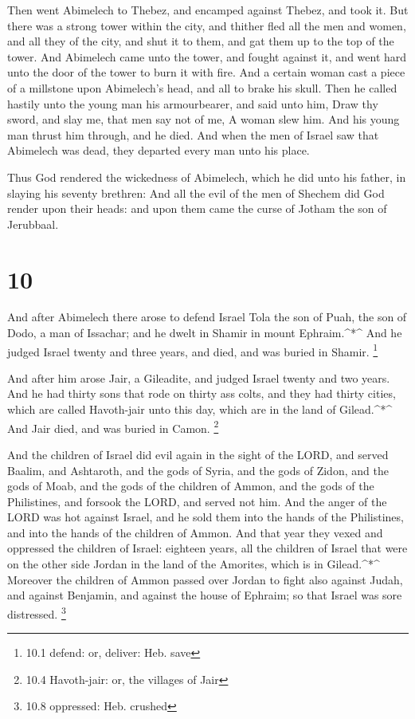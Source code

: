  Then went Abimelech to Thebez, and encamped against
Thebez, and took it.  But there was a strong tower within
the city, and thither fled all the men and women, and all they of the
city, and shut it to them, and gat them up to the top of the tower.
 And Abimelech came unto the tower, and fought against it,
and went hard unto the door of the tower to burn it with fire.
 And a certain woman cast a piece of a millstone upon
Abimelech's head, and all to brake his skull.  Then he
called hastily unto the young man his armourbearer, and said unto him,
Draw thy sword, and slay me, that men say not of me, A woman slew him.
And his young man thrust him through, and he died.  And
when the men of Israel saw that Abimelech was dead, they departed every
man unto his place.

 Thus God rendered the wickedness of Abimelech, which he
did unto his father, in slaying his seventy brethren:  And
all the evil of the men of Shechem did God render upon their heads: and
upon them came the curse of Jotham the son of Jerubbaal.

\hypertarget{section-9}{%
\section{10}\label{section-9}}

 And after Abimelech there arose to defend Israel Tola the
son of Puah, the son of Dodo, a man of Issachar; and he dwelt in Shamir
in mount Ephraim.\^{}*\^{}  And he judged Israel twenty and
three years, and died, and was buried in Shamir. \footnote{10.1 defend:
  or, deliver: Heb. save}

 And after him arose Jair, a Gileadite, and judged Israel
twenty and two years.  And he had thirty sons that rode on
thirty ass colts, and they had thirty cities, which are called
Havoth-jair unto this day, which are in the land of Gilead.\^{}*\^{}
 And Jair died, and was buried in Camon. \footnote{10.4
  Havoth-jair: or, the villages of Jair}

 And the children of Israel did evil again in the sight of
the LORD, and served Baalim, and Ashtaroth, and the gods of Syria, and
the gods of Zidon, and the gods of Moab, and the gods of the children of
Ammon, and the gods of the Philistines, and forsook the LORD, and served
not him.  And the anger of the LORD was hot against Israel,
and he sold them into the hands of the Philistines, and into the hands
of the children of Ammon.  And that year they vexed and
oppressed the children of Israel: eighteen years, all the children of
Israel that were on the other side Jordan in the land of the Amorites,
which is in Gilead.\^{}*\^{}  Moreover the children of Ammon
passed over Jordan to fight also against Judah, and against Benjamin,
and against the house of Ephraim; so that Israel was sore distressed.
\footnote{10.8 oppressed: Heb. crushed}

